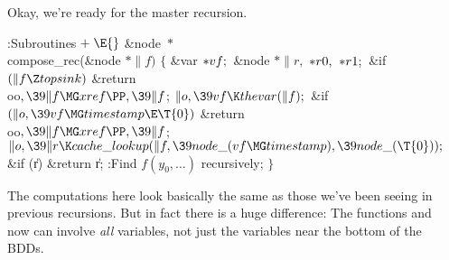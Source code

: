Okay, we're ready for the master recursion.

\Y\B\4:Subroutines\X${}\mathrel+\E{}$\6
\&{node} ${}{*}{}$\\{compose\_rec}(\&{node} ${}{*}\|f){}$\1\1\2\2\6
${}\{{}$\1\6
\&{var} ${}{*}\\{vf};{}$\6
\&{node} ${}{*}\|r,{}$ ${}{*}\\{r0},{}$ ${}{*}\\{r1};{}$\7
\&{if} ${}(\|f\Z\\{topsink}){}$\1\5
\&{return} \\{oo}${},\39\|f\MG\\{xref}\PP,\39\|f{}$;\2\6
${}\|o,\39\\{vf}\K\\{thevar}(\|f);{}$\6
\&{if} ${}(\|o,\39\\{vf}\MG\\{timestamp}\E\T{0}){}$\1\5
\&{return} \\{oo}${},\39\|f\MG\\{xref}\PP,\39\|f{}$;\2\6
${}\|o,\39\|r\K\\{cache\_lookup}(\|f,\39\\{node\_}(\\{vf}\MG\\{timestamp}),\39%
\\{node\_}(\T{0}));{}$\6
\&{if} (\|r)\1\5
\&{return} \|r;\2\6
:Find $f(y_0,\ldots{})$ recursively\X;\6
\4${}\}{}$\2\par
\fi

The computations here look basically the same as those we've been
seeing in previous recursions. But in fact there is a huge difference:
The functions  and~ now can involve {\it all\/}
variables,
not just the variables near the bottom of the BDDs.

